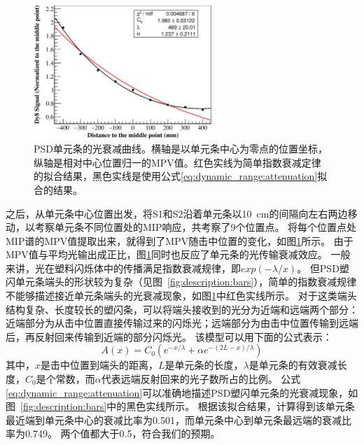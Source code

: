 \begin{figure}[htbp]
	\centering
	\includegraphics[width=0.6\textwidth]{chap/dynamic_range/fig/atten_right.eps}
	\caption{PSD单元条的光衰减曲线。横轴是以单元条中心为零点的位置坐标，纵轴是相对中心位置归一的MPV值。红色实线为简单指数衰减定律的拟合结果，黑色实线是使用公式\ref{eq:dynamic_range:attenuation}拟合的结果。}
	\label{fig:dynamic_range:attenuation}
\end{figure}
之后，从单元条中心位置出发，将S1和S2沿着单元条以\SI{10}{cm}的间隔向左右两边移动，以考察单元条不同位置处的MIP响应，共考察了9个位置点。
将每个位置点处MIP谱的MPV值提取出来，就得到了MPV随击中位置的变化，如图\ref{fig:dynamic_range:attenuation}所示。
由于MPV值与平均光输出成正比，图\ref{fig:dynamic_range:attenuation}同时也反应了单元条的光传输衰减效应。
一般来讲，光在塑料闪烁体中的传播满足指数衰减规律，即$exp(-\lambda/x)$。
但PSD塑闪单元条端头的形状较为复杂（见图~\ref{fig:description:bars}），简单的指数衰减规律不能够描述接近单元条端头的光衰减现象，如图\ref{fig:dynamic_range:attenuation}中红色实线所示。
对于这类端头结构复杂、长度较长的塑闪条，可以将端头接收到的光分为近端和远端两个部分\parencite{atten_taiuti_measurement_1996,atten_karsch_design_2001}：近端部分为从击中位置直接传输过来的闪烁光；远端部分为由击中位置传输到远端后，再反射回来传输到近端的部分闪烁光。
该模型可以用下面的公式表示：
\begin{equation}
A(x)=C_0(e^{-x/\lambda} + \alpha e^{-(2L-x)/\lambda})
\label{eq:dynamic_range:attenuation}
\end{equation}
其中，$x$是击中位置到端头的距离，$L$是单元条的长度，$\lambda$是单元条的有效衰减长度，$C_0$是个常数，而$\alpha$代表远端反射回来的光子数所占的比例。
公式\ref{eq:dynamic_range:attenuation}可以准确地描述PSD塑闪单元条的光衰减现象，如图~\ref{fig:description:bars}中的黑色实线所示。
根据该拟合结果，计算得到该单元条最近端到单元条中心的衰减比率为0.501，而单元条中心到单元条最远端的衰减比率为0.749。
两个值都大于0.5，符合我们的预期。

